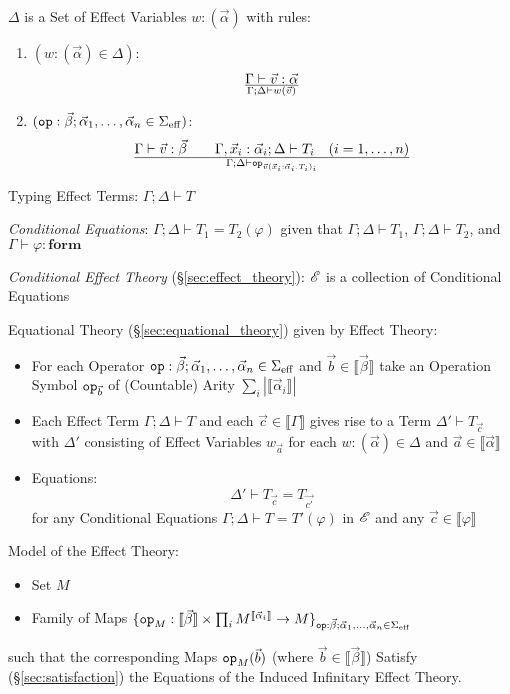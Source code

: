 $\Delta$ is a Set of Effect Variables $w:(\vec{\alpha})$ with rules:
\begin{enumerate}
  \item $(w:(\vec{\alpha}) \in \Delta)$:
  \[
    {\Gamma \vdash \vec{v}:\vec{\alpha}}
    \over{\Gamma;\Delta \vdash w(\vec{v})}
  \]
  \item $(\mathtt{op} : \vec{\beta}; \vec{\alpha}_1, \ldots,
    \vec{\alpha}_n \in \Sigma_\mathrm{eff})$:
    \[
      {\Gamma \vdash \vec{v}:\vec{\beta} \quad\quad
        \Gamma, \vec{x}_i:\vec{\alpha}_i;
        \Delta \vdash T_i \quad (i = 1, \ldots, n)}
      \over{\Gamma; \Delta \vdash
        \mathtt{op}_{\vec{v}(\vec{x}_i:\vec{\alpha}_i.T_i)_i}}
    \]
\end{enumerate}

Typing Effect Terms: $\Gamma; \Delta \vdash T$

\emph{Conditional Equations}: $\Gamma; \Delta \vdash T_1 = T_2
(\varphi)$ given that $\Gamma; \Delta \vdash T_1$, $\Gamma; \Delta
\vdash T_2$, and $\Gamma \vdash \varphi:\mathbf{form}$

\emph{Conditional Effect Theory} (\S\ref{sec:effect_theory}):
$\mathscr{E}$ is a collection of Conditional Equations

Equational Theory (\S\ref{sec:equational_theory}) given by Effect
Theory:
\begin{itemize}
  \item For each Operator $\mathtt{op}:\vec{\beta}; \vec{\alpha}_1,
    \ldots, \vec{\alpha}_n \in \Sigma_\mathrm{eff}$ and $\vec{b} \in
    \llbracket \vec{\beta} \rrbracket$ take an Operation Symbol
    $\mathtt{op}_{\vec{b}}$ of (Countable) Arity $\sum_{i}|\llbracket
    \vec{\alpha}_i \rrbracket|$
  \item Each Effect Term $\Gamma; \Delta \vdash T$ and each $\vec{c}
    \in \llbracket \Gamma \rrbracket$ gives rise to a Term $\Delta'
    \vdash T_{\vec{c}}$ with $\Delta'$ consisting of Effect Variables
    $w_{\vec{a}}$ for each $w:(\vec{\alpha}) \in \Delta$ and $\vec{a}
    \in \llbracket \vec{\alpha} \rrbracket$
  \item Equations:
    \[
      \Delta' \vdash T_{\vec{c}} = T_{\vec{c'}}
    \]
    for any Conditional Equations $\Gamma; \Delta \vdash T =
    T'(\varphi)$ in $\mathscr{E}$ and any $\vec{c} \in \llbracket \varphi
    \rrbracket$
\end{itemize}

Model of the Effect Theory:
\begin{itemize}
  \item Set $M$
  \item Family of Maps $\{ \mathtt{op}_M : \llbracket \vec{\beta}
    \rrbracket \times \prod_i M^{\llbracket \vec{\alpha}_i
      \rrbracket} \rightarrow M \}_{\mathtt{op}:\vec{\beta};
      \vec{\alpha}_1, \ldots, \vec{\alpha}_n \in
      \Sigma_{\mathrm{eff}}}$
\end{itemize}
such that the corresponding Maps $\mathtt{op}_M(\vec{b})$ (where
$\vec{b} \in \llbracket \vec{\beta} \rrbracket$) Satisfy
(\S\ref{sec:satisfaction}) the Equations of the Induced Infinitary
Effect Theory.

